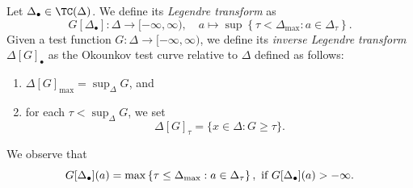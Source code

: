 \begin{definition}\label{def:LegOkoun}
    Let $\Delta_{\bullet}\in \TC(\Delta)$. We define its \emph{Legendre transform} as
    \[
	   G[\Delta_{\bullet}] \colon \Delta\rightarrow [-\infty,\infty),\quad a\mapsto \sup\left\{\tau<\Delta_{\max}:a\in \Delta_{\tau}\right\}.
	\]
     Given a test function $G\colon \Delta\rightarrow [-\infty,\infty)$, we define its \emph{inverse Legendre transform} $\Delta[G]_{\bullet}$ as the Okounkov test curve relative to $\Delta$ defined as follows:
     \begin{enumerate}
         \item\label{itm:def:LegOkoun:1} $\Delta[G]_{\max}=\sup_{\Delta} G$, and
         \item\label{itm:def:LegOkoun:2} for each $\tau<\sup_{\Delta} G$, we set
         \[
         \Delta[G]_{\tau}=\{x\in \Delta:G\geq \tau\}.
         \]
     \end{enumerate}
\end{definition}
We observe that
\begin{equation}\label{eq:GDeltamax}
    G[\Delta_{\bullet}](a)=\max\left\{\tau\leq \Delta_{\max}: a\in \Delta_{\tau}\right\},\textup{ if } G[\Delta_{\bullet}](a)>-\infty.
\end{equation}

